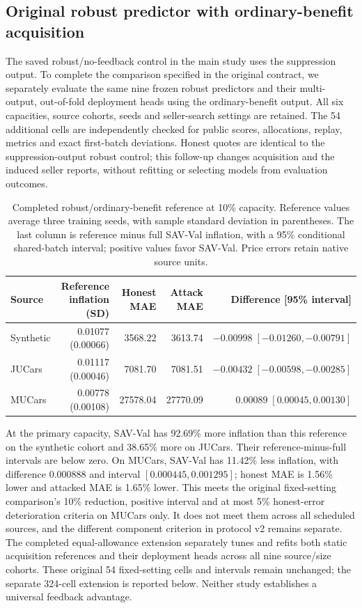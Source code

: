 \documentclass[10pt,journal]{IEEEtran}
\begin{document}
\subsection{Original robust predictor with ordinary-benefit acquisition}
The saved robust/no-feedback control in the main study uses the suppression
output. To complete the comparison specified in the original contract, we
separately evaluate the same nine frozen robust predictors and their
multi-output, out-of-fold deployment heads using the ordinary-benefit
output. All six capacities, source cohorts, seeds and seller-search settings
are retained. The 54 additional cells are independently checked for public
scores, allocations, replay, metrics and exact first-batch deviations.
Honest quotes are identical to the suppression-output robust control;
this follow-up changes acquisition and the induced seller reports, without
refitting or selecting models from evaluation outcomes.

\begin{table}[t]
\centering
\caption{Completed robust/ordinary-benefit reference at 10\% capacity.
Reference values average three training seeds, with sample standard deviation
in parentheses. The last column is reference minus full SAV-Val inflation,
with a 95\% conditional shared-batch interval; positive values favor SAV-Val.
Price errors retain native source units.}
\label{tab:robust_benefit_reference}
\begin{tabular}{lrrrr}
\toprule
Source & Reference inflation (SD) & Honest MAE & Attack MAE & Difference [95\% interval]\\
\midrule
Synthetic & 0.01077 (0.00066) & 3568.22 & 3613.74 & $-0.00998\;[-0.01260,-0.00791]$\\
JUCars & 0.01117 (0.00046) & 7081.70 & 7081.51 & $-0.00432\;[-0.00598,-0.00285]$\\
MUCars & 0.00778 (0.00108) & 27578.04 & 27770.09 & $0.00089\;[0.00045,0.00130]$\\
\bottomrule
\end{tabular}
\end{table}

At the primary capacity, SAV-Val has 92.69\% more inflation than this
reference on the synthetic cohort and 38.65\% more on JUCars. Their
reference-minus-full intervals are below zero. On MUCars, SAV-Val has
11.42\% less inflation, with difference $0.000888$ and interval
$[0.000445,0.001295]$; honest MAE is 1.56\% lower and attacked MAE
is 1.65\% lower. This meets the original fixed-setting comparison's
10\% reduction, positive interval and at most 5\% honest-error deterioration
criteria on MUCars only. It does not meet them across all scheduled sources,
and the different component criterion in protocol v2 remains separate.
The completed equal-allowance extension separately tunes and refits both
static acquisition references and their deployment heads across all nine
source/size cohorts. These original 54 fixed-setting cells and intervals remain
unchanged; the separate 324-cell extension is reported below. Neither study
establishes a universal feedback advantage.
\end{document}
